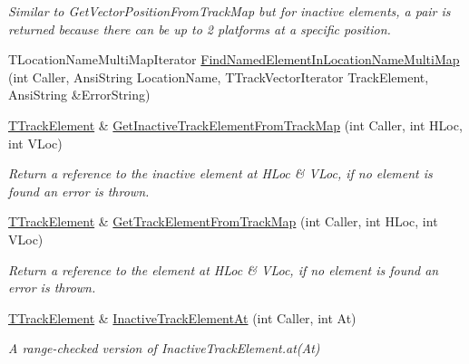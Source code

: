 \begin{DoxyCompactItemize}
\begin{DoxyCompactList}\small\item\em Similar to Get\+Vector\+Position\+From\+Track\+Map but for inactive elements, a pair is returned because there can be up to 2 platforms at a specific position. \end{DoxyCompactList}\item 
T\+Location\+Name\+Multi\+Map\+Iterator \mbox{\hyperlink{class_t_track_a694370e3ec67d43da1d8333e06d9ebba}{Find\+Named\+Element\+In\+Location\+Name\+Multi\+Map}} (int Caller, Ansi\+String Location\+Name, T\+Track\+Vector\+Iterator Track\+Element, Ansi\+String \&Error\+String)
\item 
\mbox{\label{class_t_track_a224071baecc50be0a643711bf9005db2}} 
\mbox{\hyperlink{class_t_track_element}{T\+Track\+Element}} \& \mbox{\hyperlink{class_t_track_a224071baecc50be0a643711bf9005db2}{Get\+Inactive\+Track\+Element\+From\+Track\+Map}} (int Caller, int H\+Loc, int V\+Loc)
\begin{DoxyCompactList}\small\item\em Return a reference to the inactive element at H\+Loc \& V\+Loc, if no element is found an error is thrown. \end{DoxyCompactList}\item 
\mbox{\label{class_t_track_aeb60286bc570dbafab64fe6dc06af2e4}} 
\mbox{\hyperlink{class_t_track_element}{T\+Track\+Element}} \& \mbox{\hyperlink{class_t_track_aeb60286bc570dbafab64fe6dc06af2e4}{Get\+Track\+Element\+From\+Track\+Map}} (int Caller, int H\+Loc, int V\+Loc)
\begin{DoxyCompactList}\small\item\em Return a reference to the element at H\+Loc \& V\+Loc, if no element is found an error is thrown. \end{DoxyCompactList}\item 
\mbox{\label{class_t_track_a51f89cf70e94b037f6378cd78003d82b}} 
\mbox{\hyperlink{class_t_track_element}{T\+Track\+Element}} \& \mbox{\hyperlink{class_t_track_a51f89cf70e94b037f6378cd78003d82b}{Inactive\+Track\+Element\+At}} (int Caller, int At)
\begin{DoxyCompactList}\small\item\em A range-\/checked version of Inactive\+Track\+Element.\+at(\+At) \end{DoxyCompactList}\item 

\end{DoxyCompactItemize}
